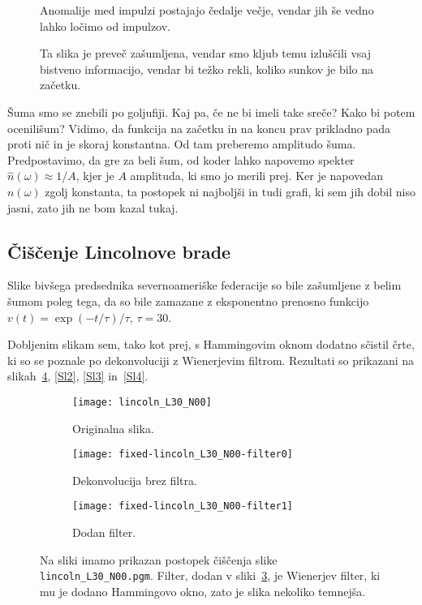 \documentclass[a4 paper, 12pt]{article}
\newcommand{\w}{
	\ensuremath{\omega}
}
\begin{document}
\begin{figure}[H]\centering
	
	\caption{Anomalije med impulzi postajajo \v cedalje ve\v cje, vendar jih \v se vedno lahko
		lo\v cimo od impulzov.}
\end{figure}

\begin{figure}[H]\centering
	
	\caption{Ta slika je preve\v c za\v sumljena, vendar smo kljub temu izlu\v s\v cili vsaj bistveno informacijo,
		vendar bi te\v zko rekli, koliko sunkov je bilo na za\v cetku.}
\end{figure}

\v Suma smo se znebili po goljufiji. Kaj pa, \v ce ne bi imeli take sre\v ce? Kako bi potem ocenili\v sum?
Vidimo, da funkcija na za\v cetku in na koncu prav prikladno pada proti ni\v c in je skoraj konstantna. Od tam
preberemo amplitudo \v suma. Predpostavimo, da gre za beli \v sum, od koder lahko napovemo spekter
$\hat{n}(\w) \approx 1/A$, kjer je $A$ amplituda, ki smo jo merili prej. Ker je napovedan $n(\w)$ zgolj
konstanta, ta postopek ni najbolj\v si in tudi grafi, ki sem jih dobil niso jasni, zato jih ne bom kazal
tukaj.

\subsection{\v Ci\v s\v cenje Lincolnove brade}

Slike biv\v sega predsednika severnoameri\v ske federacije so bile za\v sumljene z belim \v sumom poleg tega,
da so bile zamazane z eksponentno prenosno funkcijo $v(t) = \exp(-t/\tau)/\tau$, $\tau = 30$.

Dobljenim slikam sem, tako kot prej, s Hammingovim oknom dodatno s\v cistil \v crte, ki so se poznale po
dekonvoluciji z Wienerjevim filtrom. Rezultati so prikazani na slikah~\ref{Sl1}, \ref{Sl2}, \ref{Sl3} in~\ref{Sl4}.

\begin{figure}[H]\centering
	\begin{subfigure}[b]{0.3\textwidth}
		\texttt{[image: lincoln\_L30\_N00]}
		\caption{Originalna slika.}
		\label{sl11}
	\end{subfigure}
	\begin{subfigure}[b]{0.3\textwidth}
		\texttt{[image: fixed-lincoln\_L30\_N00-filter0]}
		\caption{Dekonvolucija brez filtra.}
		\label{sl12}
	\end{subfigure}
	\begin{subfigure}[b]{0.3\textwidth}
		\texttt{[image: fixed-lincoln\_L30\_N00-filter1]}
		\caption{Dodan filter.}
		\label{sl13}
	\end{subfigure}
	\caption{Na sliki imamo prikazan postopek \v ci\v s\v cenja slike {\tt lincoln\_L30\_N00.pgm}. Filter,
		dodan v sliki~\ref{sl13}, je Wienerjev filter, ki mu je dodano Hammingovo okno, zato je slika
		nekoliko temnej\v sa.}
	\label{Sl1}
\end{figure}
\end{document}

